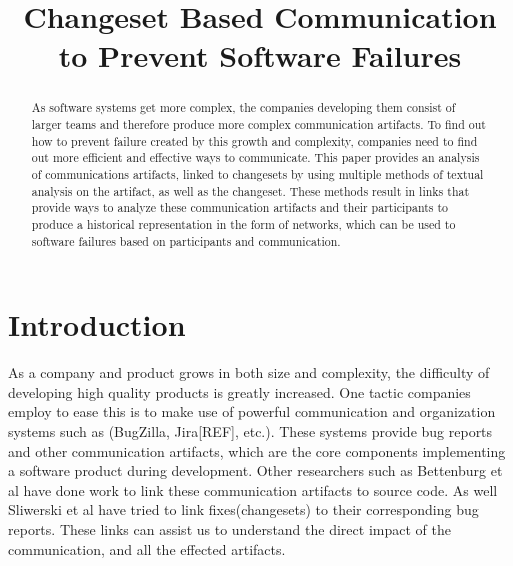 \documentclass[conference]{IEEEtran}
\begin{document}
\title{Changeset Based Communication to Prevent Software Failures}

\author{
\and
{}
\and
{}
}

\maketitle


\begin{abstract}
As software systems get more complex, the companies developing them consist of larger teams and therefore produce more complex communication artifacts.  To find out how to prevent failure created by this growth and complexity, companies need to find out more efficient and effective ways to communicate.  This paper provides an analysis of communications artifacts, linked to changesets by using multiple methods of textual analysis on the artifact, as well as the changeset.  These methods result in links that provide ways to analyze these communication artifacts and their participants to produce a historical representation in the form of networks, which can be used to software failures based on participants and communication.
\end{abstract}

\section{Introduction}
As a company and product grows in both size and complexity, the difficulty of developing high quality products is greatly increased.  One tactic companies employ to ease this is to make use of powerful communication and organization systems such as (BugZilla, Jira[REF], etc.).  These systems provide bug reports and other communication artifacts, which are the core components implementing a software product during development. 
Other researchers such as Bettenburg et al have done work to link these communication artifacts to source code\cite{Bettenburg:2008:ESI:1370750.1370757}.  As well Sliwerski et al have tried to link fixes(changesets) to their corresponding bug reports\cite{Sliwerski:2005:CIF:1083142.1083147}.  These links can assist us to understand the direct impact of the communication, and all the effected artifacts.    
\end{document}
